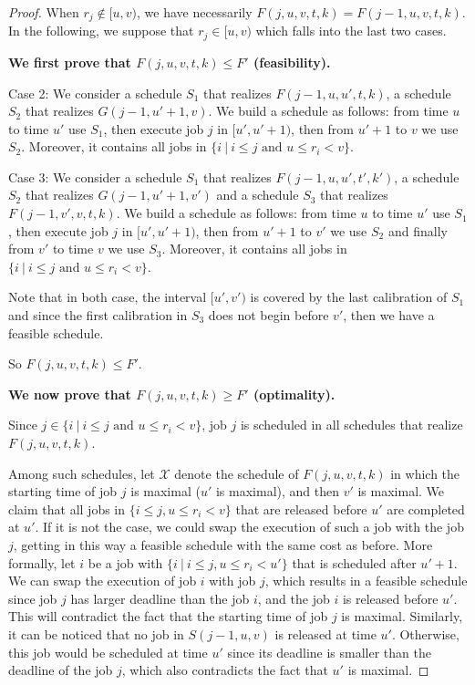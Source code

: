 \begin{proof}
When $r_j\notin [u,v)$, we have necessarily $F(j,u,v,t,k)=F(j-1,u,v,t,k)$. In the following, we suppose that $r_j\in [u,v)$ which falls into the last two cases. 


\noindent
\textbf{We first prove that $F(j,u,v,t,k) \leq F'$ (feasibility).}

Case 2: We consider a schedule $S_1$ that realizes $F(j-1,u,u',t,k)$, a schedule $S_2$ that realizes  $G(j-1,u'+1,v)$. We build a schedule as follows: from time $u$ to time $u'$ use $S_1$, then execute job $j$ in $[u',u'+1)$, then from  $u'+1$ to $v$ we use $S_2$. Moreover, it contains all jobs in $\{i~|~i \leq j \mbox{ and } u \leq r_i < v\}$. 

Case 3: We consider a schedule $S_1$ that realizes $F(j-1,u,u',t',k')$, a schedule $S_2$ that realizes  $G(j-1,u'+1,v')$ and a schedule $S_3$ that realizes $F(j-1,v',v,t,k)$. We build a schedule as follows: from time $u$ to time $u'$ use $S_1$, then execute job $j$ in $[u',u'+1)$, then from  $u'+1$ to $v'$ we use $S_2$ and finally from  $v'$ to time $v$ we use $S_3$. Moreover, it contains all jobs in $\{i~|~i \leq j \mbox{ and } u \leq r_i < v\}$. 

Note that in both case, the interval $[u',v')$ is covered by the last calibration of $S_1$ and since the first calibration in $S_3$ does not begin before $v'$, then we have a feasible schedule.

So $F(j,u,v,t,k) \leq F'$.


\noindent
\textbf{We now prove that $F(j,u,v,t,k)\geq F'$ (optimality).}

Since $j \in \{i~|~i \leq j \mbox{ and } u \leq r_i < v\}$, job $j$ is scheduled in all schedules that realize $F(j,u,v,t,k)$.

Among such schedules, let $\mathcal{X}$ denote the schedule of $F(j,u,v,t,k)$ in which the starting time of job $j$ is maximal ($u'$ is maximal), and then $v'$ is maximal. We claim that all jobs in $\{i \leq j, u \leq r_i < v\}$ that are released before $u'$ are completed at $u'$. If it is not the case, we could swap the execution of such a job with the job $j$, getting in this way a feasible schedule with the same cost as before. More formally, let $i$ be a job with $\{i~|~i \leq j, u \leq r_i < u'\}$ that is scheduled after $u'+1$. We can swap the execution of job $i$ with job $j$, which results in a feasible schedule since job $j$ has larger deadline than the job $i$, and the job $i$ is released before $u'$. This will contradict the fact that the starting time of job $j$ is maximal.
Similarly, it can be noticed that no job in $S(j-1,u,v)$ is released at time $u'$. Otherwise, this job would be scheduled at time $u'$ since its deadline is smaller than the deadline of the job $j$, which also contradicts the fact that $u'$ is maximal.




\end{proof}
